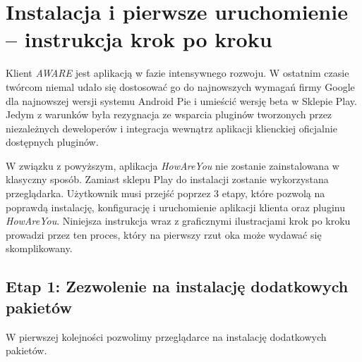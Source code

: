 \chapter{Instalacja i pierwsze uruchomienie -- instrukcja krok po kroku}
\label{cha:instalacjaIPierwszeUruchomienie}

Klient \textit{AWARE} jest aplikacją w fazie intensywnego rozwoju. W ostatnim czasie twórcom niemal udało się dostosować go do najnowszych wymagań firmy Google dla najnowszej wersji systemu Android Pie i umieścić wersję beta w Sklepie Play. Jedym z warunków była rezygnacja ze wsparcia pluginów tworzonych przez niezależnych deweloperów i integracja wewnątrz aplikacji klienckiej oficjalnie dostępnych pluginów\cite{AwareFramework}.

W związku z powyższym, aplikacja \textit{HowAreYou} nie zostanie zainstalowana w klasyczny sposób. Zamiast sklepu Play do instalacji zostanie wykorzystana przeglądarka. Użytkownik musi przejść poprzez 3 etapy, które pozwolą na poprawdą instalację, konfigurację i uruchomienie aplikacji klienta oraz pluginu \textit{HowAreYou}. Niniejsza instrukcja wraz z graficznymi ilustracjami krok po kroku prowadzi przez ten proces, który na pierwszy rzut oka może wydawać się skomplikowany.


\section{Etap 1: Zezwolenie na instalację dodatkowych pakietów}
\label{sec:zezwolenieNaInstalacjeDodatkowychPakietow}

W pierwszej kolejności pozwolimy przeglądarce na instalację dodatkowych pakietów.

